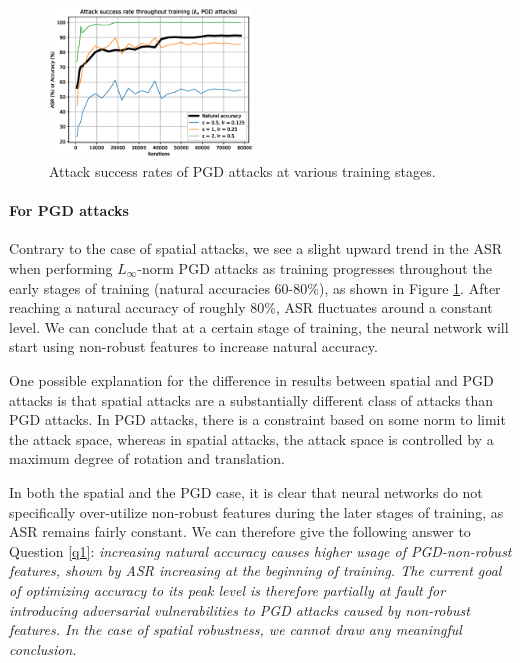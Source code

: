\begin{figure}[htb]
    \vspace{-7pt}
    \begin{center}
        \includegraphics[width=0.48\textwidth]{figs/Q1_PGD.eps}
    \end{center}
    \caption{Attack success rates of \linf PGD attacks at various training stages.} \label{fig:q1_pgd}
    \vspace{-10pt}
\end{figure}

\paragraph{For PGD attacks} Contrary to the case of spatial attacks, we see a slight upward trend in the ASR when performing $L_{\infty}$-norm PGD attacks as training progresses throughout the early stages of training (natural accuracies 60-80\%), as shown in Figure \ref{fig:q1_pgd}. After reaching a natural accuracy of roughly 80\%, ASR fluctuates around a constant level. We can conclude that at a certain stage of training, the neural network will start using non-robust features to increase natural accuracy.

One possible explanation for the difference in results between spatial and PGD attacks is that spatial attacks are a substantially different class of attacks than PGD attacks. In PGD attacks, there is a constraint based on some norm to limit the attack space, whereas in spatial attacks, the attack space is controlled by a maximum degree of rotation and translation.

In both the spatial and the PGD case, it is clear that neural networks do not specifically over-utilize non-robust features during the later stages of training, as ASR remains fairly constant. We can therefore give the following answer to Question \ref{q1}: \textit{increasing natural accuracy causes higher usage of PGD-non-robust features, shown by ASR increasing at the beginning of training. The current goal of optimizing accuracy to its peak level is therefore partially at fault for introducing adversarial vulnerabilities to PGD attacks caused by non-robust features. In the case of spatial robustness, we cannot draw any meaningful conclusion.}

